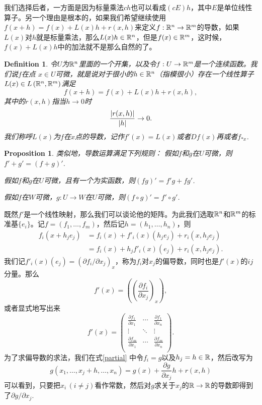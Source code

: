 \documentclass[8pt]{book}
\theoremstyle{plain}%
\newtheorem{pro}{Proposition}[section]%
\newtheorem{defi}{Definition}[section]%
\begin{document}
我们选择后者，一方面是因为标量乘法$ch$也可以看成$(cE)h$，其中$E$是单位线性算子。另一个理由是根本的，如果我们希望继续使用$f(x+h)=f(x)+L(x)h+r(x,h)$来定义$f:\mathbb{R}^n \to \mathbb{R}^m$的导数，如果$L(x)$对$h$就是标量乘法，那么$L(x)h\in \mathbb{R}^n$，但是$f(x)\in \mathbb{R}^m$，这时候，$f(x)+L(x)h$中的加法就不是那么自然的了。
\begin{defi}
	令$U$为$\mathbb{R}^n$里面的一个开集，以及令$f:U\rightarrow \mathbb{R}^m$是一个连续函数。我们说$f$在点 $x \in U$可微，就是说对于很小的$h \in \mathbb{R}^n$（指模很小）存在一个线性算子$L(x)\in L\left(\mathbb{R}^n,\mathbb{R}^m\right)$满足
	\begin{equation}
		f(x+h)=f(x)+L(x)h+r(x,h),
	\end{equation}
	其中的$r(x,h)$指当$h\to 0$时
	\begin{equation}
		\frac{\arrowvert r(x,h) \arrowvert}{\arrowvert h \arrowvert} \to 0.
	\end{equation}
	我们称呼$L(x)$为$f$在$x$点的导数，记作$f'(x)=L(x)$或者$Df(x)$再或者$f_{*x}$.
\end{defi}
\begin{pro}
	类似地，导数运算满足下列规则：	
	假如$f$和$g$在$U$可微，则$f'+g'=(f+g)'$.
	
	假如$f$和$g$在$U$可微，且有一个为实函数，则$(fg)'=f'g+fg'$.
	
	假如$f$在$W$可微，$g:U\to W$在$U$可微，则$(f\circ g)'=f'\circ g'$.
\end{pro}
既然$f'$是一个线性映射，那么我们可以谈论他的矩阵。为此我们选取$\mathbb{R}^n$和$\mathbb{R}^m$的标准基$\{e_i\}$。记$f=(f_1,\dots,f_m)$，然后记$h=(h_1,\dots,h_n)$，则
\begin{equation}
	\begin{split}
		f_i(x+h_je_j)&=f_i(x)+f'_i(x)\left(h_je_j\right)+r_i(x,h_je_j)\\
		&=f_i(x)+h_jf'_i(x)\left(e_j\right)+r_i(x,h_je_j).
	\end{split}
	\label{partial}
\end{equation}
我们记$f'_i(x)\left(e_j\right)=\left(\partial f_i/\partial x_j\right)_x$，称为$f_i$对$x_j$的偏导数，同时也是$f'(x)$的$ij$分量。那么
\[
	f'(x)=\left(\left(\frac{\partial f_i}{\partial x_j}\right)_x\right),
\]
或者显式地写出来
\[
	f'(x)=
		\begin{pmatrix}
			\displaystyle{\frac{\partial f_1}{\partial x_1}}&\cdots&\displaystyle{\frac{\partial f_1}{\partial x_n}}\\
			\vdots&\ddots&\vdots\\
			\displaystyle{\frac{\partial f_m}{\partial x_1}}&\cdots&\displaystyle{\frac{\partial f_m}{\partial x_n}}\\
		\end{pmatrix}.
\]
为了求偏导数的求法，我们在式\eqref{partial} 中令$f_i=g$以及$h_j=h\in \mathbb{R}$，然后改写为
\[
	g(x_1,\dots,x_j+h,\dots,x_n)=g(x)+\frac{\partial g}{\partial x_j}h+r(x,h)
\]
可以看到，只要把$x_i\,(i\neq j)$看作常数，然后对$g$求关于$x_j$的$\mathbb{R}\to \mathbb{R}$的导数即得到了$\partial g/\partial x_j$.
\end{document}
